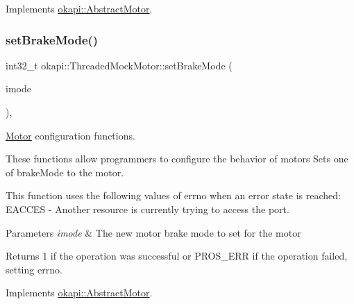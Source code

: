Implements \mbox{\hyperlink{classokapi_1_1AbstractMotor_a15d12555f527109b046c65fe753d7e20}{okapi\+::\+Abstract\+Motor}}.

\mbox{\label{classokapi_1_1ThreadedMockMotor_a77560a5d50838cd289c41bb1c0a73454}} 
\subsubsection{\texorpdfstring{setBrakeMode()}{setBrakeMode()}}
{\footnotesize\ttfamily int32\+\_\+t okapi\+::\+Threaded\+Mock\+Motor\+::set\+Brake\+Mode (\begin{DoxyParamCaption}\item[{\mbox{\hyperlink{classokapi_1_1AbstractMotor_a132e0485dbb59a60c3f934338d8fa601}{brake\+Mode}}}]{imode }\end{DoxyParamCaption})\hspace{0.3cm}{\ttfamily [override]}, {\ttfamily [virtual]}}



\mbox{\hyperlink{classokapi_1_1Motor}{Motor}} configuration functions. 

These functions allow programmers to configure the behavior of motors Sets one of brake\+Mode to the motor.

This function uses the following values of errno when an error state is reached\+: E\+A\+C\+C\+ES -\/ Another resource is currently trying to access the port.


\begin{DoxyParams}{Parameters}
{\em imode} & The new motor brake mode to set for the motor \\
\hline
\end{DoxyParams}
\begin{DoxyReturn}{Returns}
1 if the operation was successful or P\+R\+O\+S\+\_\+\+E\+RR if the operation failed, setting errno. 
\end{DoxyReturn}


Implements \mbox{\hyperlink{classokapi_1_1AbstractMotor_af7bb7d0d895c89d6b193f500587a818b}{okapi\+::\+Abstract\+Motor}}.

\mbox{\label{classokapi_1_1ThreadedMockMotor_a718e4336bdc0fd8077abda0773045226}} 

